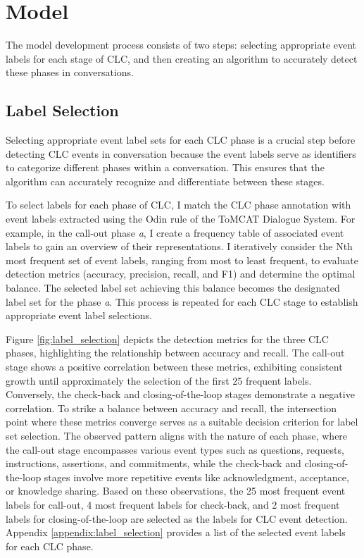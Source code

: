 \documentclass[11pt]{article}
\begin{document}
\section{Model}
The model development process consists of two steps: selecting appropriate event labels for each stage of CLC, and then creating an algorithm to accurately detect these phases in conversations.

\subsection{Label Selection}
Selecting appropriate event label sets for each CLC phase is a crucial step before detecting CLC events in conversation because the event labels serve as identifiers to categorize different phases within a conversation. This ensures that the algorithm can accurately recognize and differentiate between these stages.

To select labels for each phase of CLC, I match the CLC phase annotation with event labels extracted using the Odin rule of the ToMCAT Dialogue System. For example, in the call-out phase \textit{a}, I create a frequency table of associated event labels to gain an overview of their representations. I iteratively consider the Nth most frequent set of event labels, ranging from most to least frequent, to evaluate detection metrics (accuracy, precision, recall, and F1) and determine the optimal balance. The selected label set achieving this balance becomes the designated label set for the phase \textit{a}. This process is repeated for each CLC stage to establish appropriate event label selections. 

Figure \ref{fig:label_selection} depicts the detection metrics for the three CLC phases, highlighting the relationship between accuracy and recall. The call-out stage shows a positive correlation between these metrics, exhibiting consistent growth until approximately the selection of the first 25 frequent labels. Conversely, the check-back and closing-of-the-loop stages demonstrate a negative correlation. To strike a balance between accuracy and recall, the intersection point where these metrics converge serves as a suitable decision criterion for label set selection. The observed pattern aligns with the nature of each phase, where the call-out stage encompasses various event types such as questions, requests, instructions, assertions, and commitments, while the check-back and closing-of-the-loop stages involve more repetitive events like acknowledgment, acceptance, or knowledge sharing. Based on these observations, the 25 most frequent event labels for call-out, 4 most frequent labels for check-back, and 2 most frequent labels for closing-of-the-loop are selected as the labels for CLC event detection. Appendix \ref{appendix:label_selection} provides a list of the selected event labels for each CLC phase.
\end{document}
